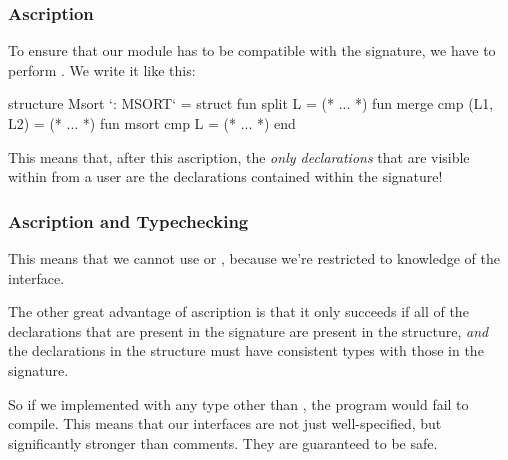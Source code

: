 \documentclass[aspectratio=169]{beamer}
\begin{document}
\begin{frame}[fragile]
  \frametitle{Ascription}


  \vspace{\fill}

  To ensure that our  module has to be compatible with the
   signature, we have to perform . We write it
  like this:

  \begin{codeblock}
    structure Msort `: MSORT` =
      struct 
        fun split L = (* ... *)
        fun merge cmp (L1, L2) = (* ... *)
        fun msort cmp L = (* ... *)
      end
  \end{codeblock}

  \vspace{\fill}

  This means that, after this ascription, the \textit{only declarations} that 
  are visible within  from a user are the declarations contained
  within the  signature! 
\end{frame}

\begin{frame}[fragile]
  \frametitle{Ascription and Typechecking}

  This means that we cannot use  or ,
  because we're restricted to knowledge of the interface. 

  \vspace{\fill}

  The other great advantage of ascription is that it only succeeds if
  all of the declarations that are present in the signature are present in
  the structure, \textit{and} the declarations in the structure must have
  consistent types with those in the signature.

  \vspace{\fill}

  So if we implemented  with any type other than 
  , the program would
  fail to compile. This means that our interfaces are not just well-specified,
  but significantly stronger than comments. They are guaranteed to be safe.
\end{frame}

\end{document}
